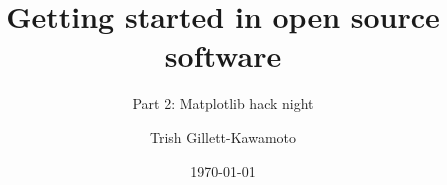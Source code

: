 \documentclass{beamer}
\title{Getting started in open source software}
\subtitle{Part 2: Matplotlib hack night}
\author{Trish Gillett-Kawamoto}
\date{\today}
\institute{Pyladies Montreal}
\begin{document}
\begin{frame}[plain,t]
\titlepage
\end{frame}



\begin{frame}{}
	
\end{frame}




\ThankYouFrame
\end{document}
